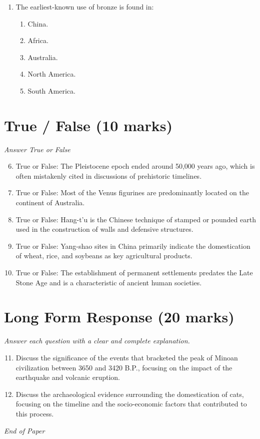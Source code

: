 \documentclass[12pt]{article}
\begin{document}
\begin{enumerate}[label=\arabic*.]
\begin{enumerate}[label=(\alph*)]
    \item both humans and environmental changes.
    \item the spread of invasive plant species which altered their habitat.
    \item a sudden drastic climate change due to global warming.
    \item humans who carried diseases over the land bridge.
\end{enumerate}
\item The earliest-known use of bronze is found in:
\begin{enumerate}[label=(\alph*)]
    \item China.
    \item Africa.
    \item Australia.
    \item North America.
    \item South America.
\end{enumerate}
\end{enumerate}

\section*{True / False (10 marks)}
\textit{Answer True or False}
\begin{enumerate}[label=\arabic*.]
\setcounter{enumi}{5}
\item True or False: The Pleistocene epoch ended around 50,000 years ago, which is often mistakenly cited in discussions of prehistoric timelines.
\item True or False: Most of the Venus figurines are predominantly located on the continent of Australia.
\item True or False: Hang-t'u is the Chinese technique of stamped or pounded earth used in the construction of walls and defensive structures.
\item True or False: Yang-shao sites in China primarily indicate the domestication of wheat, rice, and soybeans as key agricultural products.
\item True or False: The establishment of permanent settlements predates the Late Stone Age and is a characteristic of ancient human societies.
\end{enumerate}

\section*{Long Form Response (20 marks)}
\textit{Answer each question with a clear and complete explanation.}
\begin{enumerate}[label=\arabic*.]
\setcounter{enumi}{10}
\item Discuss the significance of the events that bracketed the peak of Minoan civilization
between 3650 and 3420 B.P., focusing on the impact of the earthquake and volcanic
eruption.
\item Discuss the archaeological evidence surrounding the domestication of cats, focusing on the
timeline and the socio-economic factors that contributed to this process.
\end{enumerate}

\vfill
\noindent\textit{End of Paper}
\end{document}
